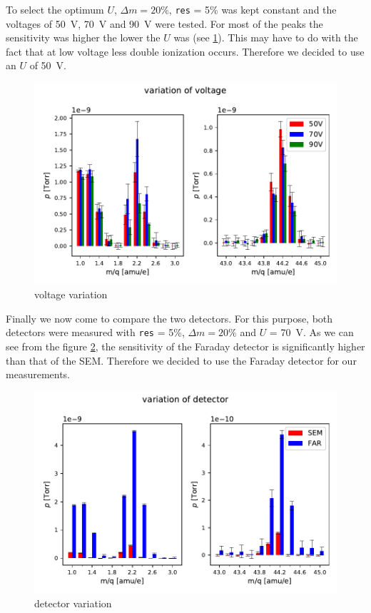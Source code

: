     To select the optimum $U$, $\Delta m = 20 \%$, \texttt{res} = 5\% was kept constant and the voltages of 50~V, 70~V and 90~V were tested. For most of the peaks the sensitivity was higher the lower the $U$ was (see \ref{fig:voltage_variation}). This may have to do with the fact that at low voltage less double ionization occurs. Therefore we decided to use an $U$ of 50~V.  
    
    \begin{figure}[h!]
        \centering
        \includegraphics[width=1 \textwidth]{Report/DataResultsPlots/voltage_variation_h2_and_co2.pdf}
        \caption{voltage variation}
        \label{fig:voltage_variation}
    \end{figure}
    
    Finally we now come to compare the two detectors. For this purpose, both detectors were measured with \texttt{res} = 5\%, $\Delta m = 20\%$ and $U$ = 70~V. As we can see from the figure \ref{fig:detector_variation}, the sensitivity of the Faraday detector is significantly higher than that of the SEM. Therefore we decided to use the Faraday detector for our measurements. 
    \begin{figure}[h!]
        \centering
        \includegraphics[width=1 \textwidth]{Report/DataResultsPlots/detector_variation_h2_and_co2.pdf}
        \caption{detector variation}
        \label{fig:detector_variation}
    \end{figure}
    
